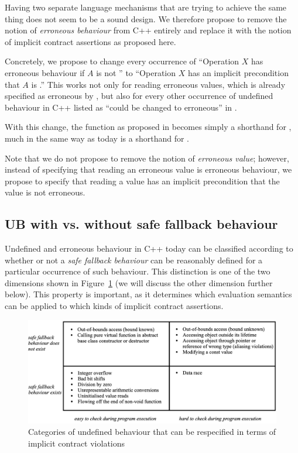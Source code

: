 Having two separate language mechanisms that are trying to achieve the same thing does not seem to be a sound design. We therefore propose to remove the notion of \emph{erroneous behaviour} from C++ entirely and replace it with the notion of implicit contract assertions as proposed here.

Concretely, we propose to change every occurrence of ``Operation $X$ has erroneous behaviour if $A$ is not '' to ``Operation $X$ has an implicit precondition that $A$ is .'' This works not only for reading erroneous values, which is already specified as erroneous by \cite{P2795R5}, but also for every other occurrence of undefined behaviour in C++ listed as ``could be changed to erroneous'' in \cite{P2795R5}.

With this change, the function  as proposed in \cite{P3232R0} becomes simply a shorthand for , much in the same way as  today is a shorthand for .

Note that we do not propose to remove the notion of \emph{erroneous value}; however, instead of specifying that reading an erroneous value is erroneous behaviour, we propose to specify that reading a value has an implicit precondition that the value is not erroneous.

\subsection{UB with vs. without safe fallback behaviour}
\label{fallback}

Undefined and erroneous behaviour in C++ today can be classified according to whether or not a \emph{safe fallback behaviour} can be reasonably defined for a particular occurrence of such behaviour. This distinction is one of the two dimensions shown in Figure~\ref{fig_quadrants} (we will discuss the other dimension further below). This property is important, as it determines which evaluation semantics can be applied to which kinds of implicit contract assertions.

\begin{figure}[b]
\begin{center}
\includegraphics[scale=0.32]{images/p3100_quadrants.png}
\end{center}
\caption{Categories of undefined behaviour that can be respecified in terms of implicit contract violations}
\label{fig_quadrants}
\end{figure}

